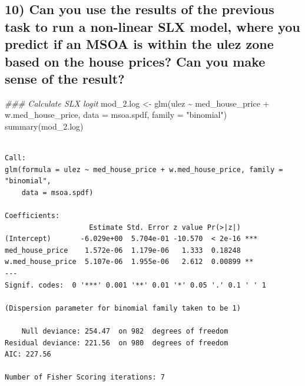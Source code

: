 \documentclass[
  letterpaper,
]{scrbook}
\newenvironment{Shaded}{\begin{snugshade}}{\end{snugshade}}
\newcommand{\AttributeTok}[1]{\textcolor[rgb]{0.40,0.45,0.13}{#1}}
\newcommand{\DocumentationTok}[1]{\textcolor[rgb]{0.37,0.37,0.37}{\textit{#1}}}
\newcommand{\FunctionTok}[1]{\textcolor[rgb]{0.28,0.35,0.67}{#1}}
\newcommand{\NormalTok}[1]{\textcolor[rgb]{0.00,0.23,0.31}{#1}}
\newcommand{\OtherTok}[1]{\textcolor[rgb]{0.00,0.23,0.31}{#1}}
\newcommand{\SpecialCharTok}[1]{\textcolor[rgb]{0.37,0.37,0.37}{#1}}
\newcommand{\StringTok}[1]{\textcolor[rgb]{0.13,0.47,0.30}{#1}}
\begin{document}
\hypertarget{can-you-use-the-results-of-the-previous-task-to-run-a-non-linear-slx-model-where-you-predict-if-an-msoa-is-within-the-ulez-zone-based-on-the-house-prices-can-you-make-sense-of-the-result}{%
\subsection{10) Can you use the results of the previous task to run a
non-linear SLX model, where you predict if an MSOA is within the ulez
zone based on the house prices? Can you make sense of the
result?}\label{can-you-use-the-results-of-the-previous-task-to-run-a-non-linear-slx-model-where-you-predict-if-an-msoa-is-within-the-ulez-zone-based-on-the-house-prices-can-you-make-sense-of-the-result}}

\begin{Shaded}
\begin{Highlighting}[]
\DocumentationTok{\#\#\# Calculate SLX logit}
\NormalTok{mod\_2.log }\OtherTok{\textless{}{-}} \FunctionTok{glm}\NormalTok{(ulez }\SpecialCharTok{\textasciitilde{}}\NormalTok{ med\_house\_price }\SpecialCharTok{+}\NormalTok{ w.med\_house\_price,}
                 \AttributeTok{data =}\NormalTok{ msoa.spdf,}
                 \AttributeTok{family =} \StringTok{"binomial"}\NormalTok{)}
\FunctionTok{summary}\NormalTok{(mod\_2.log)}
\end{Highlighting}
\end{Shaded}

\begin{verbatim}

Call:
glm(formula = ulez ~ med_house_price + w.med_house_price, family = "binomial", 
    data = msoa.spdf)

Coefficients:
                    Estimate Std. Error z value Pr(>|z|)    
(Intercept)       -6.029e+00  5.704e-01 -10.570  < 2e-16 ***
med_house_price    1.572e-06  1.179e-06   1.333  0.18248    
w.med_house_price  5.107e-06  1.955e-06   2.612  0.00899 ** 
---
Signif. codes:  0 '***' 0.001 '**' 0.01 '*' 0.05 '.' 0.1 ' ' 1

(Dispersion parameter for binomial family taken to be 1)

    Null deviance: 254.47  on 982  degrees of freedom
Residual deviance: 221.56  on 980  degrees of freedom
AIC: 227.56

Number of Fisher Scoring iterations: 7
\end{verbatim}
\end{document}

